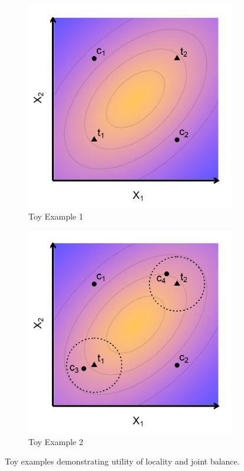 \documentclass{article}
\begin{document}
\begin{figure}[t]
    \centering
    \begin{subfigure}[ht]{0.4\textwidth}
         \centering
         \includegraphics[width=\textwidth]{writeup/figures/toyexample1.png}
         \caption{Toy Example 1}
         \label{fig:toy1}
     \end{subfigure}
     \hspace{5mm}
     \begin{subfigure}[ht]{0.4\textwidth}
         \centering
         \includegraphics[width=\textwidth]{writeup/figures/toyexample2.png}
         \caption{Toy Example 2}
         \label{fig:toy2}
     \end{subfigure}
    \caption{Toy examples demonstrating utility of locality and joint balance.}
    \label{fig:toy}
\end{figure}
\end{document}
